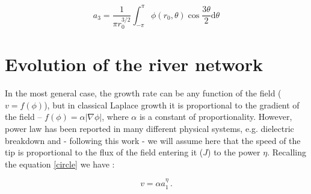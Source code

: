 \documentclass[]{pracamgr}
\begin{document}
    \begin{equation}
      \label{a3}
      a_3 = \frac{1}{\pi r_0^{3/2}}\int^{\pi}_{-\pi} \phi(r_0,\theta)\cos\frac{3\theta}{2}\textrm{d}\theta
    \end{equation}	
    



  \section{Evolution of the river network}
    

    In the most general case, the growth rate can be any function of the field ($v = f(\phi)$), but in classical Laplace growth it is proportional to the gradient of the field -- $f(\phi) = \alpha |\nabla \phi |$, where $\alpha$ is a constant of proportionality. However, power law has been reported in many different physical systems, e.g. dielectric breakdown \cite{niemeyer1984fractal} and - following this work - we will assume here that the speed of the tip is proportional to the flux of the field entering it ($J$) to the power $\eta$. Recalling the equation \eqref{circle} we have \cite{carleson2002laplacian, selander1999two}:
       
    \begin{equation}\label{velocity}
      v = \alpha a_1^\eta \,.
    \end{equation}
      
\end{document}
